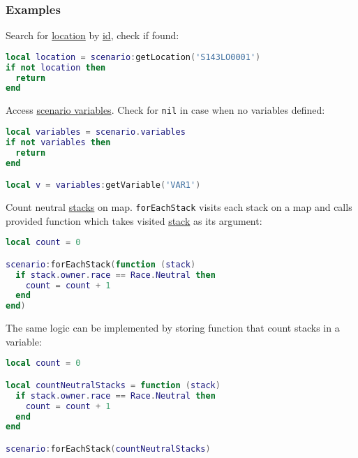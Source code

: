 \subsubsection{Examples}
Search for \hyperref[Location]{location} by \hyperref[Id]{id}, check if found:
\begin{center}
\begin{lstlisting}[language=Lua]
local location = scenario:getLocation('S143LO0001')
if not location then
  return
end
\end{lstlisting}
\end{center}
Access \hyperref[ScenarioVariables]{scenario variables}. Check for \texttt{nil} in case when no variables defined:
\begin{center}
\begin{lstlisting}[language=Lua]
local variables = scenario.variables
if not variables then
  return
end

local v = variables:getVariable('VAR1')
\end{lstlisting}
\end{center}
Count neutral \hyperref[Stack]{stacks} on map. \texttt{forEachStack} visits each stack on a map and calls provided function which takes visited \hyperref[Stack]{stack} as its argument:
\begin{center}
\begin{lstlisting}[language=Lua]
local count = 0

scenario:forEachStack(function (stack)
  if stack.owner.race == Race.Neutral then
    count = count + 1
  end
end)
\end{lstlisting}
\end{center}
The same logic can be implemented by storing function that count stacks in a variable:
\begin{center}
\begin{lstlisting}[language=Lua]
local count = 0

local countNeutralStacks = function (stack)
  if stack.owner.race == Race.Neutral then
    count = count + 1
  end
end

scenario:forEachStack(countNeutralStacks)
\end{lstlisting}
\end{center}